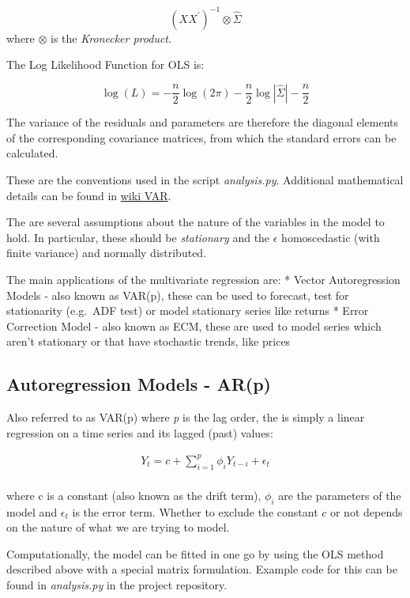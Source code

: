\documentclass{article}
\begin{document}
\[
(X X^\prime)^{-1} \otimes \hat{\Sigma}
\] where \(\otimes\) is the \emph{Kronecker product}.

The Log Likelihood Function for OLS is:

\[
\log(L) = -\frac{n}{2}\log (2 \pi) -\frac{n}{2}\log | \hat{\Sigma}| - \frac{n}{2}
\]

The variance of the residuals and parameters are therefore the diagonal
elements of the corresponding covariance matrices, from which the
standard errors can be calculated.

These are the conventions used in the script \emph{analysis.py}.
Additional mathematical details can be found in
\href{https://en.wikipedia.org/wiki/Vector_autoregression}{wiki VAR}.

The are several assumptions about the nature of the variables in the
model to hold. In particular, these should be \emph{stationary} and the
\(\epsilon\) homoscedastic (with finite variance) and normally
distributed.

The main applications of the multivariate regression are: * Vector
Autoregression Models - also known as VAR(p), these can be used to
forecast, test for stationarity (e.g.~ADF test) or model stationary
series like returns * Error Correction Model - also known as ECM, these
are used to model series which aren't stationary or that have stochastic
trends, like prices

    \subsection{Autoregression Models -
AR(p)}\label{autoregression-models---arp}

Also referred to as VAR(p) where \emph{p} is the lag order, the is
simply a linear regression on a time series and its lagged (past)
values:

\[
\begin{align}
Y_t = c + \sum^{p}_{i=1} \phi_i Y_{t-i} + \epsilon_t \\
\end{align}
\]

where c is a constant (also known as the drift term), \(\phi_i\) are the
parameters of the model and \(\epsilon_t\) is the error term. Whether to
exclude the constant \(c\) or not depends on the nature of what we are
trying to model.

Computationally, the model can be fitted in one go by using the OLS
method described above with a special matrix formulation. Example code
for this can be found in \emph{analysis.py} in the project repository.
\end{document}
